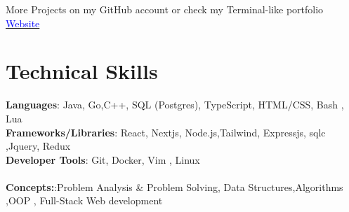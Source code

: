 \documentclass[letterpaper,11pt]{article}
\begin{document}
{\item{
     More Projects on my GitHub account or check my Terminal-like portfolio \href{https://wterm-two.vercel.app/}{\textcolor{blue}{Website}}}}

%
\section{Technical Skills}
 \begin{itemize}[leftmargin=0.15in, label={}]
    \small{\item{
     \textbf{Languages}{: Java, Go,C++, SQL (Postgres), TypeScript, HTML/CSS, Bash , Lua} \\
     \textbf{Frameworks/Libraries}{: React, Nextjs, Node.js,Tailwind, Expressjs, sqlc ,Jquery, Redux} \\
     \textbf{Developer Tools}{: Git, Docker, Vim , Linux} \\
     } \\
    \textbf{Concepts:}{:Problem Analysis & Problem Solving, Data Structures,Algorithms ,OOP , Full-Stack Web development} \\
     
    }
 \end{itemize}

\end{document}
